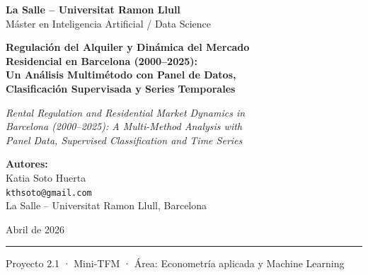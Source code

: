 \documentclass[12pt,a4paper]{article}
\begin{document}

\begin{titlepage}
  \centering
  \vspace*{1cm}

  {\Large \textbf{La Salle -- Universitat Ramon Llull}\\[0.3em]
  \large Máster en Inteligencia Artificial / Data Science}

  \vspace{1.5cm}

  {\LARGE \bfseries
   Regulación del Alquiler y Dinámica del Mercado\\[0.4em]
   Residencial en Barcelona (2000--2025):\\[0.5em]
   Un Análisis Multimétodo con Panel de Datos,\\[0.4em]
   Clasificación Supervisada y Series Temporales}

  \vspace{0.8cm}
  {\large \textit{Rental Regulation and Residential Market Dynamics in\\
  Barcelona (2000--2025): A Multi-Method Analysis with\\
  Panel Data, Supervised Classification and Time Series}}

  \vspace{1.5cm}

  {\large \textbf{Autores:}\\[0.4em]
  Katia Soto Huerta\\[0.2em]
  \texttt{kthsoto@gmail.com}\\[0.4em]
  La Salle -- Universitat Ramon Llull, Barcelona}

  \vspace{1.2cm}
  {\large Abril de 2026}

  \vfill
  \hrule
  \vspace{0.3cm}
  \small{Proyecto 2.1 · Mini-TFM · Área: Econometría aplicada y Machine Learning}
\end{titlepage}
\end{document}
